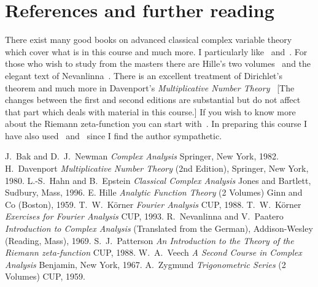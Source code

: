 \section{References and further reading} There exist many
good books on advanced classical complex variable
theory which cover what is in this course and much more.
I particularly like~\cite{Veech} and~\cite{Epstein}.
For those who wish to study from the masters there
are Hille's two volumes~\cite{Hille} and
the elegant text of Nevanlinna~\cite{Nevanlinna}.
There is an excellent treatment of Dirichlet's
theorem and much more in Davenport's
\emph{Multiplicative Number Theory}~\cite{Davenport}
[The changes between the first and second editions
are substantial but do not affect that part which
deals with material in this course.]
If you wish to know more about the Riemann zeta-function
you can start with~\cite{Patterson}.
In preparing this course I have also used~\cite{Korner1}
and~\cite{Korner2} since I find the author sympathetic.
\begin{thebibliography}{99}
 J.~Bak and D.~J.~Newman
\emph{Complex Analysis}
Springer, New York, 1982.
 H.~Davenport
\emph{Multiplicative Number Theory}
(2nd Edition), Springer, New York, 1980.
 L.-S.~Hahn and B.~Epstein
\emph{Classical Complex Analysis}
Jones and Bartlett, Sudbury, Mass, 1996.
 E. Hille
\emph{Analytic Function Theory} (2 Volumes)
Ginn and Co (Boston), 1959.
 T.~W.~K\"{o}rner 
\emph{Fourier Analysis}
CUP, 1988.
 T.~W.~K\"{o}rner 
\emph{Exercises for Fourier Analysis}
CUP, 1993.
 R.~Nevanlinna and V.~Paatero
\emph{Introduction to Complex Analysis}
(Translated from the German), Addison-Wesley
(Reading, Mass), 1969.
 S.~J.~Patterson
\emph{An Introduction to the Theory of the Riemann zeta-function}
CUP, 1988.
 W.~A.~Veech 
\emph{A Second Course in Complex Analysis}
Benjamin, New York, 1967.
 A.~Zygmund
\emph{Trigonometric Series} (2 Volumes)
CUP, 1959. 
\end{thebibliography}
